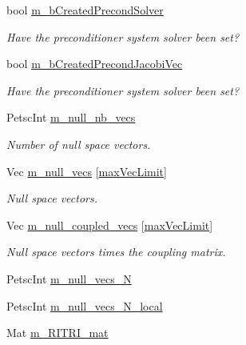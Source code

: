 \begin{DoxyCompactItemize}
bool \hyperlink{classcarl_1_1_f_e_t_i___operations_a13dd551fd49ca08e4595c7829ccc90b8}{m\+\_\+b\+Created\+Precond\+Solver}
\begin{DoxyCompactList}\small\item\em Have the preconditioner system solver been set? \end{DoxyCompactList}\item 
bool \hyperlink{classcarl_1_1_f_e_t_i___operations_a49ca6d93078c918d738d64388b74f589}{m\+\_\+b\+Created\+Precond\+Jacobi\+Vec}
\begin{DoxyCompactList}\small\item\em Have the preconditioner system solver been set? \end{DoxyCompactList}\item 
Petsc\+Int \hyperlink{classcarl_1_1_f_e_t_i___operations_a6be71b08544858c4b4609bf2a2927a17}{m\+\_\+null\+\_\+nb\+\_\+vecs}
\begin{DoxyCompactList}\small\item\em Number of null space vectors. \end{DoxyCompactList}\item 
Vec \hyperlink{classcarl_1_1_f_e_t_i___operations_a81ca84aa058155a0a0f586625c6f93b7}{m\+\_\+null\+\_\+vecs} \mbox{[}\hyperlink{classcarl_1_1_f_e_t_i___operations_a6c98b3cd5887cc030609a3aaf7b1f202ac039a3f911176eb2dca0ef95a7349edb}{max\+Vec\+Limit}\mbox{]}
\begin{DoxyCompactList}\small\item\em Null space vectors. \end{DoxyCompactList}\item 
Vec \hyperlink{classcarl_1_1_f_e_t_i___operations_a162af22ae7e7410cf5ce6fe07f301e63}{m\+\_\+null\+\_\+coupled\+\_\+vecs} \mbox{[}\hyperlink{classcarl_1_1_f_e_t_i___operations_a6c98b3cd5887cc030609a3aaf7b1f202ac039a3f911176eb2dca0ef95a7349edb}{max\+Vec\+Limit}\mbox{]}
\begin{DoxyCompactList}\small\item\em Null space vectors times the coupling matrix. \end{DoxyCompactList}\item 
Petsc\+Int \hyperlink{classcarl_1_1_f_e_t_i___operations_aa9a450cb613998b62b4af846ff4b0453}{m\+\_\+null\+\_\+vecs\+\_\+\+N}
\item 
Petsc\+Int \hyperlink{classcarl_1_1_f_e_t_i___operations_a0b7be9a279d71535a43e7c808289f1df}{m\+\_\+null\+\_\+vecs\+\_\+\+N\+\_\+local}
\item 
Mat \hyperlink{classcarl_1_1_f_e_t_i___operations_aaad5dcc66e63627427b79d5e22b3df6f}{m\+\_\+\+R\+I\+T\+R\+I\+\_\+mat}

\end{DoxyCompactItemize}
